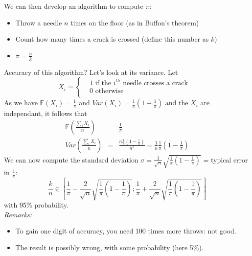 We can then develop an algorithm to compute $\pi$:
\begin{itemize}
\item Throw a needle $n$ times on the floor (as in Buffon's theorem)
\item Count how many times a crack is crossed (define this number as $k$)
\item $\pi = \frac{n}{k}$
\end{itemize}

Accuracy of this algorithm? Let's look at its variance. Let
$$
X_i = \left\{
      \begin{aligned}
        &1 \text{ if the } i^{th} \text{ needle crosses a crack}& \\
        &0 \text{ otherwise}& \\
      \end{aligned}
    \right.
$$
As we have $\mathbb{E}(X_i)=\frac{1}{\pi}$ and $Var(X_i) = \frac{1}{\pi}(1-\frac{1}{\pi})$ and the $X_i$ are independant, it follows that
\begin{eqnarray*}
\mathbb{E}(\frac{\sum_i X_i}{n}) &=& \frac{1}{\pi} \\
Var(\frac{\sum_i X_i}{n}) &=& \frac{n \frac{1}{\pi}(1-\frac{1}{\pi})}{n^2} = \frac{1}{n}\frac{1}{\pi}(1-\frac{1}{\pi})
\end{eqnarray*}
We can now compute the standard deviation $\sigma = \frac{1}{\sqrt{n}}\sqrt{\frac{1}{\pi}(1-\frac{1}{\pi})}$ = typical error in $\frac{1}{\pi}$:
$$
\frac{k}{n} \in [\frac{1}{\pi}-\frac{2}{\sqrt{n}}\sqrt{\frac{1}{\pi}(1-\frac{1}{\pi})}; \frac{1}{\pi}+\frac{2}{\sqrt{n}}\sqrt{\frac{1}{\pi}(1-\frac{1}{\pi})}]
$$
with 95\% probability.\\
\textit{Remarks:}
\begin{itemize}
\item To gain one digit of accuracy, you need 100 times more throws: not good.
\item The result is possibly wrong, with some probability (here 5\%).
\end{itemize}

%